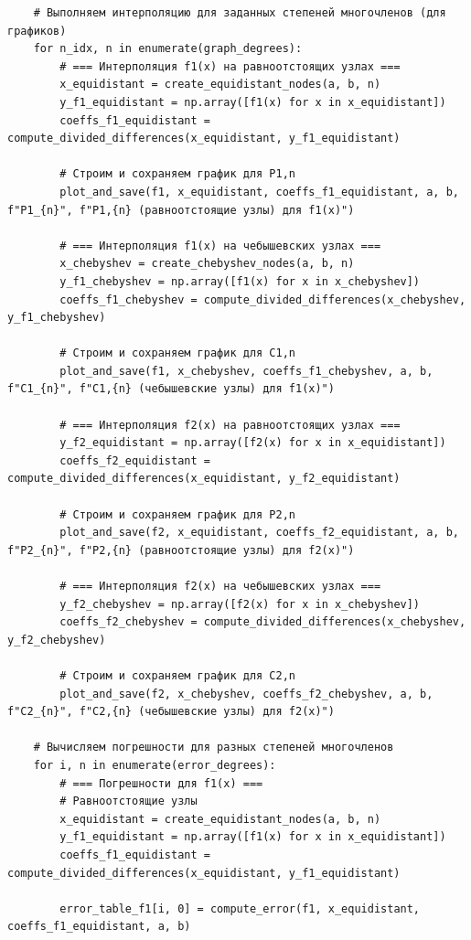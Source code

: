 \documentclass[12pt]{article}
\begin{document}
\begin{verbatim}
    # Выполняем интерполяцию для заданных степеней многочленов (для графиков)
    for n_idx, n in enumerate(graph_degrees):
        # === Интерполяция f1(x) на равноотстоящих узлах ===
        x_equidistant = create_equidistant_nodes(a, b, n)
        y_f1_equidistant = np.array([f1(x) for x in x_equidistant])
        coeffs_f1_equidistant = compute_divided_differences(x_equidistant, y_f1_equidistant)
        
        # Строим и сохраняем график для P1,n
        plot_and_save(f1, x_equidistant, coeffs_f1_equidistant, a, b, f"P1_{n}", f"P1,{n} (равноотстоящие узлы) для f1(x)")
        
        # === Интерполяция f1(x) на чебышевских узлах ===
        x_chebyshev = create_chebyshev_nodes(a, b, n)
        y_f1_chebyshev = np.array([f1(x) for x in x_chebyshev])
        coeffs_f1_chebyshev = compute_divided_differences(x_chebyshev, y_f1_chebyshev)
        
        # Строим и сохраняем график для C1,n
        plot_and_save(f1, x_chebyshev, coeffs_f1_chebyshev, a, b, f"C1_{n}", f"C1,{n} (чебышевские узлы) для f1(x)")
        
        # === Интерполяция f2(x) на равноотстоящих узлах ===
        y_f2_equidistant = np.array([f2(x) for x in x_equidistant])
        coeffs_f2_equidistant = compute_divided_differences(x_equidistant, y_f2_equidistant)
        
        # Строим и сохраняем график для P2,n
        plot_and_save(f2, x_equidistant, coeffs_f2_equidistant, a, b, f"P2_{n}", f"P2,{n} (равноотстоящие узлы) для f2(x)")
        
        # === Интерполяция f2(x) на чебышевских узлах ===
        y_f2_chebyshev = np.array([f2(x) for x in x_chebyshev])
        coeffs_f2_chebyshev = compute_divided_differences(x_chebyshev, y_f2_chebyshev)
        
        # Строим и сохраняем график для C2,n
        plot_and_save(f2, x_chebyshev, coeffs_f2_chebyshev, a, b, f"C2_{n}", f"C2,{n} (чебышевские узлы) для f2(x)")
    
    # Вычисляем погрешности для разных степеней многочленов
    for i, n in enumerate(error_degrees):
        # === Погрешности для f1(x) ===
        # Равноотстоящие узлы
        x_equidistant = create_equidistant_nodes(a, b, n)
        y_f1_equidistant = np.array([f1(x) for x in x_equidistant])
        coeffs_f1_equidistant = compute_divided_differences(x_equidistant, y_f1_equidistant)
        
        error_table_f1[i, 0] = compute_error(f1, x_equidistant, coeffs_f1_equidistant, a, b)
        

\end{verbatim}
\end{document}
